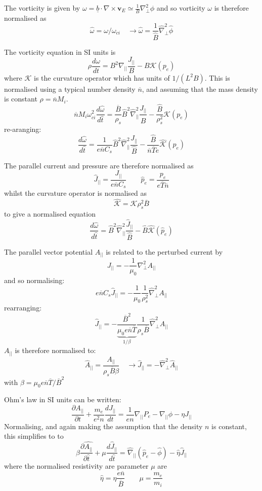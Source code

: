 \documentclass[12pt]{article}
\newcommand{\deriv}[2]{\ensuremath{\frac{\partial #1}{\partial #2}}}
\newcommand{\bvec}{\ensuremath{\underline{b}}}
\newcommand{\apar}{\ensuremath{A_{||}}}
\begin{document}
The vorticity is given by $\omega = \bvec\cdot\nabla\times \mathbf{v}_E \simeq \frac{1}{B}\nabla_\perp^2\phi$ and so
vorticity $\omega$ is therefore normalised as
\[
\boxed{\hat{\omega} = \omega / \omega_{ci}} \quad \rightarrow \hat{\omega} = \frac{1}{\hat{B}}\hat{\nabla}_\perp^2\hat{\phi}
\]

The vorticity equation in SI units is
\[
\rho\frac{d\omega}{dt} = B^2\nabla_{||}\frac{J_{||}}{B} - B\mathcal{K}\left(p_e\right)
\]
where $\mathcal{K}$ is the curvature operator which has units of $1/\left(L^2B\right)$.
This is normalised using a typical number density $\overline{n}$, and assuming that the mass density is constant
$\rho = \overline{n}M_i$.
\[
\overline{n}M_i\omega_{ci}^2\frac{d\hat{\omega}}{d\hat{t}} = \frac{\overline{B}}{\rho_s}\hat{B}^2\hat{\nabla}_{||}^2\frac{J_{||}}{\hat{B}} - \frac{\hat{B}}{\rho_s^2}\hat{\mathcal{K}}\left(p_e\right)
\]
re-aranging:
\[
\frac{d\hat{\omega}}{d\hat{t}} = \frac{1}{e\overline{n}C_s}\hat{B}^2\hat{\nabla}_{||}^2\frac{J_{||}}{\hat{B}} - \frac{\hat{B}}{\overline{n}\overline{T}e}\hat{\mathcal{K}}\left(p_e\right)
\]

The parallel current and pressure are therefore normalised as
\[
\boxed{\hat{J}_{||} = \frac{J_{||}}{e\overline{n}C_s}} \qquad \boxed{\hat{p}_e = \frac{p_e}{e\overline{T}\overline{n}}}
\]
whilst the curvature operator is normalised as
\[
\boxed{\hat{\mathcal{K}} = \mathcal{K}\rho_s^2\overline{B}}
\]
to give a normalised equation
\[
\frac{d\hat{\omega}}{d\hat{t}} = \hat{B}^2\hat{\nabla}_{||}^2\frac{\hat{J}_{||}}{\hat{B}} - \hat{B}\hat{\mathcal{K}}\left(\hat{p}_e\right)
\]

The parallel vector potential $A_{||}$ is related to the perturbed current by
\[
J_{||} = -\frac{1}{\mu_0}\nabla_\perp^2 A_{||}
\]
and so normalising:
\[
e\overline{n}C_s\hat{J}_{||} = -\frac{1}{\mu_0}\frac{1}{\rho_s^2}\hat{\nabla}_\perp^2A_{||}
\]
rearranging:
\[
\hat{J}_{||} = -\underbrace{\frac{\overline{B}^2}{\mu_0 e\overline{n}\overline{T}}}_{1/\beta}\frac{1}{\rho_s\overline{B}}\hat{\nabla}_\perp^2 A_{||}
\]
$A_{||}$ is therefore normalised to:
\[
\boxed{\hat{A}_{||} = \frac{A_{||}}{\rho_s\overline{B}\beta}} \quad \rightarrow \hat{J}_{||} = -\hat{\nabla}_\perp^2 \hat{A}_{||}
\]
with $\beta = \mu_0 e\overline{n}\overline{T}/\overline{B}^2$

Ohm's law in SI units can be written:
\[
\deriv{\apar}{t} + \frac{m_e}{e^2n}\frac{dJ_{||}}{dt} = \frac{1}{en}\nabla_{||}P_e - \nabla_{||}\phi - \eta J_{||}
\]
Normalising, and again making the assumption that the density $n$ is constant, this simplifies to
to
\[
\beta\deriv{\hat{\apar}}{\hat{t}} + \mu\frac{d\hat{J}_{||}}{d\hat{t}} = \hat{\nabla}_{||}\left(\hat{p}_e - \hat{\phi}\right) - \hat{\eta}\hat{J}_{||}
\]
where the normalised resistivity are parameter $\mu$ are
\[
\boxed{\hat{\eta} = \eta\frac{e\overline{n}}{\overline{B}}} \qquad \mu = \frac{m_e}{m_i}
\]
\end{document}
